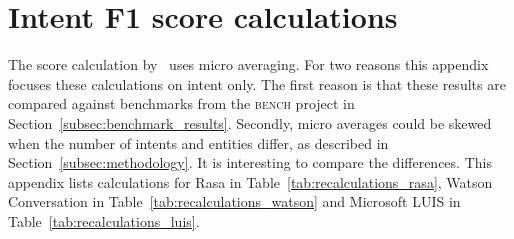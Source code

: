 \chapter{Intent F1 score calculations}
\label{ch:intent_f1_score_calculations}

The \fone score calculation by~\citep{braun2017} uses micro averaging.
For two reasons this appendix focuses these calculations on intent only.
The first reason is that these results are compared against benchmarks from the \textsc{bench} project in Section~\ref{subsec:benchmark_results}.
Secondly, micro averages could be skewed when the number of intents and entities differ, as described in Section~\ref{subsec:methodology}.
It is interesting to compare the differences.
This appendix lists calculations for Rasa in Table~\ref{tab:recalculations_rasa}, Watson Conversation in Table~\ref{tab:recalculations_watson} and Microsoft LUIS in Table~\ref{tab:recalculations_luis}.

